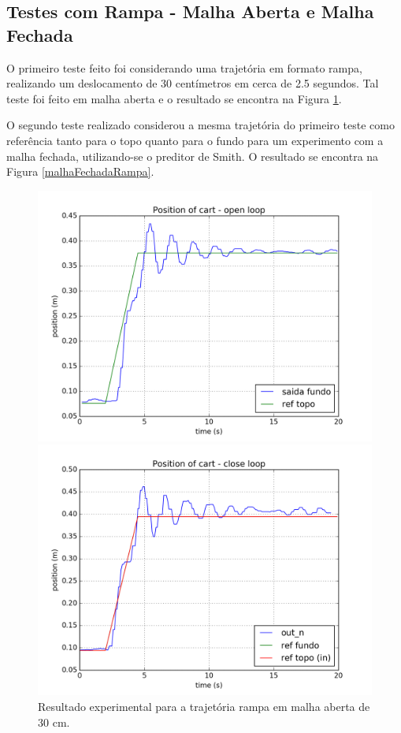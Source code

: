 \subsection{Testes com Rampa - Malha Aberta e Malha Fechada}
O primeiro teste feito foi considerando uma trajetória em formato rampa, realizando um deslocamento de 30 centímetros em cerca de 2.5 segundos. Tal teste foi feito em malha aberta e o resultado se encontra na Figura \ref{malhaAbertaRampa}. 

O segundo teste realizado considerou a mesma trajetória do primeiro teste como referência tanto para o topo quanto para o fundo para um experimento com a malha fechada, utilizando-se o preditor de Smith. O resultado se encontra na Figura \ref{malhaFechadaRampa}.

\begin{figure}[!ht]
\centering
\begin{minipage}{0.45\textwidth}
\centering
\includegraphics[width=1\linewidth]{figs/resultados/experimento/open_loop_ramp}
\caption{Resultado experimental para a trajetória rampa em malha aberta de 30 cm. \label{malhaAbertaRampa}}
\end{minipage}
\hspace{0.1cm}
\begin{minipage}{0.45\textwidth}
\centering
\includegraphics[width=1\linewidth]{figs/resultados/experimento/closed_loop_trajetoria_rampa}

\end{minipage}
\end{figure}
